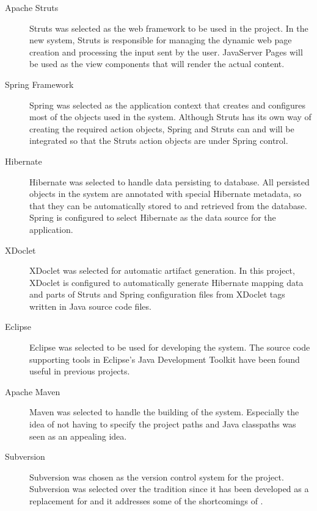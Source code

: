 \begin{description}

\item[Apache Struts] Struts was selected as the web framework to be 
used in the project. In the new system, Struts is responsible for 
managing the dynamic web page creation and processing the input sent 
by the user. JavaServer Pages will be used as the view components that 
will render the actual  content.

\item[Spring Framework] Spring was selected as the application context 
that creates and configures most of the objects used in the system. 
Although Struts has its own way of creating the required action 
objects, Spring and Struts can and will be integrated so that the 
Struts action objects are under Spring control.

\item[Hibernate] Hibernate was selected to handle data persisting to 
database. All persisted objects in the system are annotated with 
special Hibernate metadata, so that they can be automatically stored 
to and retrieved from the database. Spring is configured to select 
Hibernate as the data source for the application.

\item[XDoclet] XDoclet was selected for automatic artifact generation. 
In this project, XDoclet is configured to automatically generate 
Hibernate mapping data and parts of Struts and Spring configuration 
files from XDoclet tags written in Java source code files.

\item[Eclipse] Eclipse was selected to be used for developing the 
system. The source code supporting tools in Eclipse's Java Development 
Toolkit have been found useful in previous projects.

\item[Apache Maven] Maven was selected to handle the building of the 
system. Especially the idea of not having to specify the project paths 
and Java classpaths was seen as an appealing idea.

\item[Subversion] Subversion was chosen as the version control system 
for the project. Subversion was selected over the tradition 
 since it has been developed as a replacement for 
 and it addresses some of the shortcomings of .

\end{description}


